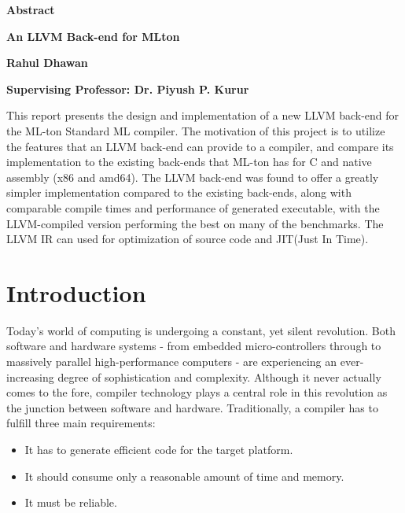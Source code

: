 \documentclass{book}
\begin{document}
\thispagestyle{plain}
\begin{center}
    
    \huge{\textbf{Abstract}}
 
    \vspace{0.4cm}
    \large
    \textbf{An LLVM Back-end for MLton}
    
    \vspace{0.4cm}
    \textbf{Rahul Dhawan}
 
    \vspace{0.4cm}
    \textbf{Supervising Professor: Dr. Piyush P. Kurur }
    
    \vspace{1.0cm}
    \justify
    This report presents the design and implementation of a new LLVM back-end for the ML-ton Standard ML compiler. The motivation of this project is to utilize the features that an LLVM back-end can provide to a compiler, and compare its implementation to the existing back-ends that ML-ton has for C and native assembly (x86 and amd64).  The LLVM back-end was found to offer a greatly simpler implementation compared to the existing back-ends, along with comparable compile times and performance of generated executable, with the LLVM-compiled version performing the best on many of the benchmarks. The LLVM IR can used for optimization of source code and JIT(Just In Time).
\end{center}

\tableofcontents

\chapter{Introduction}
   \Large
   Today's world of computing is undergoing a constant, yet silent revolution. Both
   software and hardware systems - from embedded micro-controllers through to massively
   parallel high-performance computers - are experiencing an ever-increasing degree of
   sophistication and complexity. Although it never actually comes to the fore, compiler
   technology plays a central role in this revolution as the junction between software and
   hardware. Traditionally, a compiler has to fulfill three main requirements:
   \begin{itemize}
   	\item It has to generate efficient code for the target platform.
   	\item It should consume only a reasonable amount of time and memory.
   	\item It must be reliable.
   \end{itemize}
\end{document}
